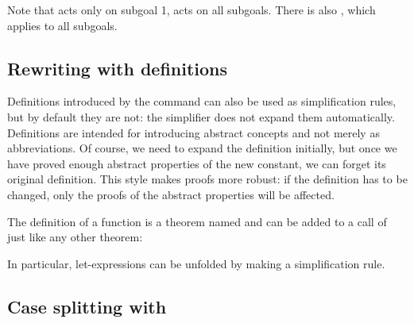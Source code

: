 \begin{isabellebody}
\begin{isamarkuptext}
Note that  acts only on subgoal 1,  acts on all
subgoals. There is also , which applies  to
all subgoals.

\subsection{Rewriting with definitions}
\label{sec:rewr-defs}

Definitions introduced by the command 
can also be used as simplification rules,
but by default they are not: the simplifier does not expand them
automatically. Definitions are intended for introducing abstract concepts and
not merely as abbreviations. Of course, we need to expand the definition
initially, but once we have proved enough abstract properties of the new
constant, we can forget its original definition. This style makes proofs more
robust: if the definition has to be changed, only the proofs of the abstract
properties will be affected.

The definition of a function  is a theorem named 
and can be added to a call of  just like any other theorem:
\begin{quote}
\end{quote}
In particular, let-expressions can be unfolded by
making  a simplification rule.

\subsection{Case splitting with }


\end{isamarkuptext}
\end{isabellebody}
